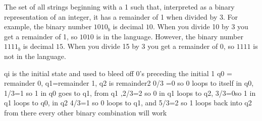 \documentclass{article}
\begin{document}
\pagebreak
\question%
The set of all strings beginning with a 1 such that, interpreted as a binary
representation of an integer, it has a remainder of 1 when divided by 3.  For
example, the binary number $1010_b$ is decimal $10$.  When you divide 10 by 3
you get a remainder of 1, so $1010$ is in the language.  However, the binary
number $1111_b$ is decimal $15$.  When you divide 15 by 3 you get a remainder of
0, so $1111$ is not in the language.

\begin{center}
\end{center}
\answer
qi is the initial state and used to bleed off 0's preceding the initial 1
q0 = remainder 0, q1=remainder 1, q2 is remainder2 0/3 =0 so 0 loops to itself in q0, 1/3=1 so 1 in q0 goes to q1, from q1 ,2/3=2 so 0 in q1 loops to q2, 3/3=0so 1 in q1 loops to q0, in q2 4/3=1 so 0 loops to q1, and 5/3=2 so 1 loops back into q2 from there every other binary combination will work
\end{document}
